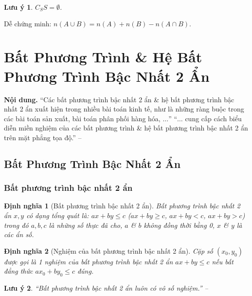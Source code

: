 \documentclass{article}
\numberwithin{equation}{section}
\newtheorem{definition}{Định nghĩa}[section]
\newtheorem{remark}{Lưu ý}[section]
\begin{document}
\begin{remark}
	$C_SS = \emptyset$.
\end{remark}
Dễ chứng minh: $n(A\cup B) = n(A) + n(B) - n(A\cap B)$.


\section{Bất Phương Trình \& Hệ Bất Phương Trình Bậc Nhất 2 Ẩn}
\textbf{Nội dung.} ``Các bất phương trình bậc nhất 2 ẩn \& hệ bất phương trình bậc nhất 2 ẩn xuất hiện trong nhiều bài toán kinh tế, như là những ràng buộc trong các bài toán sản xuất, bài toán phân phối hàng hóa, $\ldots$'' ``$\ldots$ cung cấp cách biểu diễn miền nghiệm của các bất phương trình \& hệ bất phương trình bậc nhất 2 ẩn trên mặt phẳng tọa độ.'' -- \cite[p. 22]{Khoai_Anh_Tan_Thang_Anh_Cuong_Duong_Dang_Ha_Hanh_Hong_Son_Tuan_Vuong_Toan_10_tap_1}

\subsection{Bất Phương Trình Bậc Nhất 2 Ẩn}

\subsubsection{Bất phương trình bậc nhất 2 ẩn}

\begin{definition}[Bất phương trình bậc nhất 2 ẩn]
	\emph{Bất phương trình bậc nhất 2 ẩn} $x,y$ có dạng tổng quát là: $ax + by\le c$ ($ax + by\ge c$, $ax + by < c$, $ax + by > c$) trong đó $a,b,c$ là những số thực đã cho, $a$ \& $b$ không đồng thời bằng 0, $x$ \& $y$ là các \emph{ẩn số}.
\end{definition}

\begin{definition}[Nghiệm của bất phương trình bậc nhất 2 ẩn]
	Cặp số $(x_0,y_0)$ được gọi là 1 \emph{nghiệm} của bất phương trình bậc nhất 2 ẩn $ax + by\le c$ nếu bất đẳng thức $ax_0 + by_0\le c$ đúng.
\end{definition}

\begin{remark}
	``Bất phương trình bậc nhất 2 ẩn luôn có vô số nghiệm.'' -- \cite[p. 23]{Khoai_Anh_Tan_Thang_Anh_Cuong_Duong_Dang_Ha_Hanh_Hong_Son_Tuan_Vuong_Toan_10_tap_1}
\end{remark}
\end{document}
